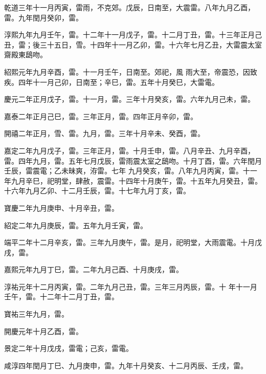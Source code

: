 \begin{pinyinscope}
 乾道三年十一月丙寅，雷雨，不克郊。戊辰，日南至，大震雷。八年九月乙酉，雷。九年閏月癸卯，雷。



 淳熙九年九月壬午，雷。十二年十一月戊子，雷。十二月丁丑，雷。十三年正月己丑，雷；後三十五日，雪。十四年十一月乙卯，雷。十六年七月乙丑，大雷震太室齋殿東鴟吻。



 紹熙元年九月辛酉，雷。十一月壬午，日南至。郊祀，風
 雨大至，帝震恐，因致疾。四年十一月己卯，日南至；辛巳，雷。五年十月癸巳，大雷電。



 慶元二年正月戊子，雷。十一月，雷。三年十月癸亥，雷。六年九月己未，雷。



 嘉泰二年正月己巳，雷。三年正月，雷。四年正月辛卯，雷。



 開禧二年正月，雪、雷。九月，雷。三年十月辛未、癸酉，雷。



 嘉定二年九月戊子，雷。三年正月，雷。十月壬申，雷。八月辛丑、九月辛酉，雷。四年九月，雷。五年七月戊辰，雷雨震太室之鴟吻。十月丁酉，雷。六年閏月壬辰，雷震電；乙未昧爽，洊雷。七年
 九月癸亥，雷。八年九月丙寅，雷。十一年九月辛巳，祀明堂，肆赦，震雷。十四年十月庚午，雷。十五年九月癸丑，雷。十六年九月乙卯、十二月壬辰，雷。十七年九月丁亥，雷。



 寶慶二年九月庚申、十月辛丑，雷。



 紹定二年九月庚辰，雷。五年九月壬寅，雷。



 端平二年十二月辛亥，雷。三年九月庚午，雷。是月，祀明堂，大雨震電。十月戊戌，雷。



 嘉熙元年九月丁巳，雷。二年九月己酉、十月庚戌，雷。



 淳祐元年十二月丙寅，雷。二年九月己丑，雷。三年三月丙辰，雷。十
 年十一月壬午，雷。十二年十二月丁丑，雷。



 寶祐三年九月，雷。



 開慶元年十月乙酉，雷。



 景定二年十月戊戌，雷電；己亥，雷電。



 咸淳四年閏月丁巳、九月庚申，雷。九年十月癸亥、十二月丙辰、壬戌，雷。




\end{pinyinscope}
